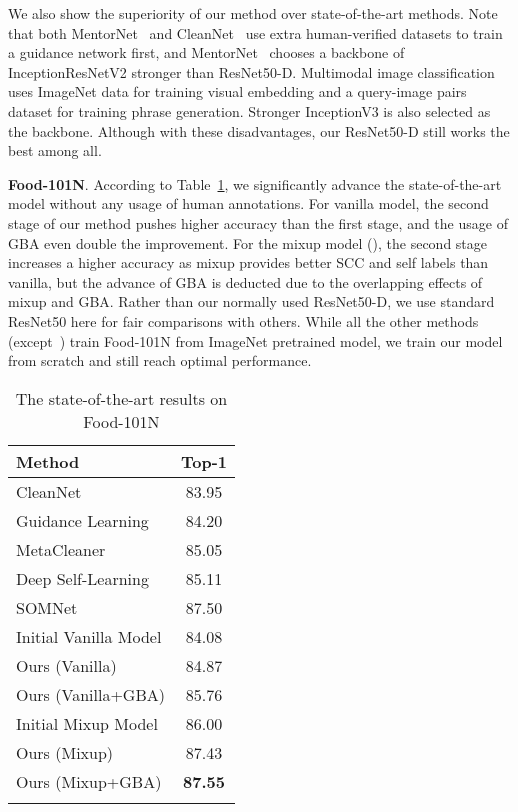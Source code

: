 \documentclass[runningheads]{llncs}
\begin{document}
We also show the superiority of our method over state-of-the-art methods. Note that both MentorNet~\cite{jiang2018mentornet} and CleanNet~ \cite{lee2018cleannet} use extra human-verified datasets to train a guidance network first, and MentorNet~\cite{jiang2018mentornet} chooses a backbone of InceptionResNetV2 stronger than ResNet50-D. Multimodal image classification~\cite{shah2019inferring} uses ImageNet data for training visual embedding and a query-image pairs dataset for training phrase generation. Stronger InceptionV3 is also selected as the backbone. Although with these disadvantages, our ResNet50-D still works the best among all.

\textbf{Food-101N}.
According to Table~\ref{tab:food101N}, we significantly advance the state-of-the-art model without any usage of human annotations.
For vanilla model, the second stage of our method pushes  higher accuracy than the first stage, and the usage of GBA even double the improvement.
For the mixup model (), the second stage increases a higher  accuracy as mixup provides better SCC and self labels than vanilla, but the advance of GBA is deducted due to the overlapping effects of mixup and GBA.
Rather than our normally used ResNet50-D, we use standard ResNet50 here for fair comparisons with others. While all the other methods (except~\cite{zhang2019metacleaner}) train Food-101N from ImageNet pretrained model, we train our model from scratch and still reach optimal performance.

\begin{table}[t!]
\caption{The state-of-the-art results on Food-101N}
\label{tab:food101N}
	\centering
	\begin{tabular}{@{\hskip 5pt}l@{\hskip 30pt}c@{\hskip 5pt}}
		\toprule
		Method & Top-1 \\
		\midrule
		CleanNet \cite{lee2018cleannet} & 83.95\\
		Guidance Learning \cite{li2019product}& 84.20\\
		MetaCleaner \cite{zhang2019metacleaner}& 85.05\\
		Deep Self-Learning \cite{han2019deep} & 85.11\\
		SOMNet \cite{tu2020learning} & 87.50\\
		\midrule
		Initial Vanilla Model &84.08\\
		Ours (Vanilla) & 84.87\\
		Ours (Vanilla+GBA) & 85.76\\
		\midrule
		Initial Mixup Model &86.00\\
		Ours (Mixup) & 87.43\\
		Ours (Mixup+GBA) & \textbf{87.55}\\
		\bottomrule
		\noalign{\bigskip}
	\end{tabular}
\end{table}
\end{document}
